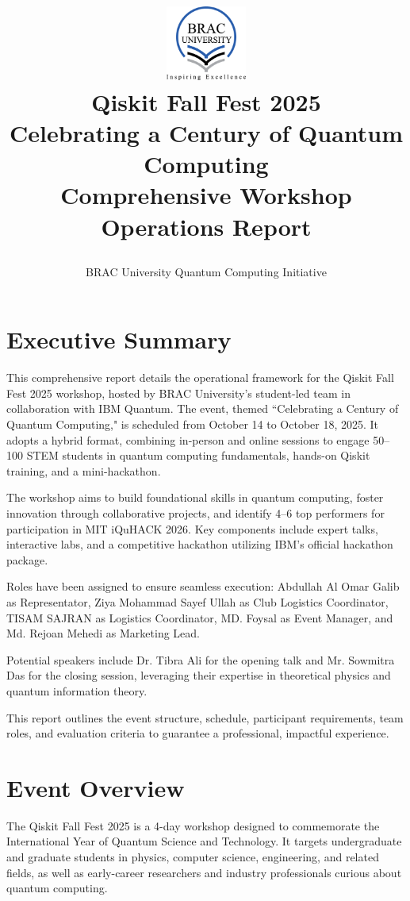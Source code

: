 \documentclass[11pt,a4paper]{article}
\title{
    \vspace{-1cm}
    \begin{center}
        \includegraphics[width=0.2\textwidth]{Images/Logo/brac-university-logo.png}\\[0.5cm]
        {\Huge\textbf{Qiskit Fall Fest 2025}} \\[0.3cm]
        {\Large Celebrating a Century of Quantum Computing} \\[0.3cm]
        {\large Comprehensive Workshop Operations Report}
    \end{center}
    \vspace{-0.5cm}
}
\author{
    \normalsize BRAC University Quantum Computing Initiative
}
\date{}
\begin{document}
\maketitle

\thispagestyle{empty}

\newpage

\tableofcontents

\newpage

\section{Executive Summary}

This comprehensive report details the operational framework for the Qiskit Fall Fest 2025 workshop, hosted by BRAC University's student-led team in collaboration with IBM Quantum. The event, themed ``Celebrating a Century of Quantum Computing," is scheduled from October 14 to October 18, 2025. It adopts a hybrid format, combining in-person and online sessions to engage 50--100 STEM students in quantum computing fundamentals, hands-on Qiskit training, and a mini-hackathon.

The workshop aims to build foundational skills in quantum computing, foster innovation through collaborative projects, and identify 4--6 top performers for participation in MIT iQuHACK 2026. Key components include expert talks, interactive labs, and a competitive hackathon utilizing IBM's official hackathon package.

Roles have been assigned to ensure seamless execution: Abdullah Al Omar Galib as Representator, Ziya Mohammad Sayef Ullah as Club Logistics Coordinator, TISAM SAJRAN as Logistics Coordinator, MD. Foysal as Event Manager, and Md. Rejoan Mehedi as Marketing Lead.

Potential speakers include Dr. Tibra Ali for the opening talk and Mr. Sowmitra Das for the closing session, leveraging their expertise in theoretical physics and quantum information theory.

This report outlines the event structure, schedule, participant requirements, team roles, and evaluation criteria to guarantee a professional, impactful experience.

\section{Event Overview}

The Qiskit Fall Fest 2025 is a 4-day workshop designed to commemorate the International Year of Quantum Science and Technology. It targets undergraduate and graduate students in physics, computer science, engineering, and related fields, as well as early-career researchers and industry professionals curious about quantum computing.
\end{document}

